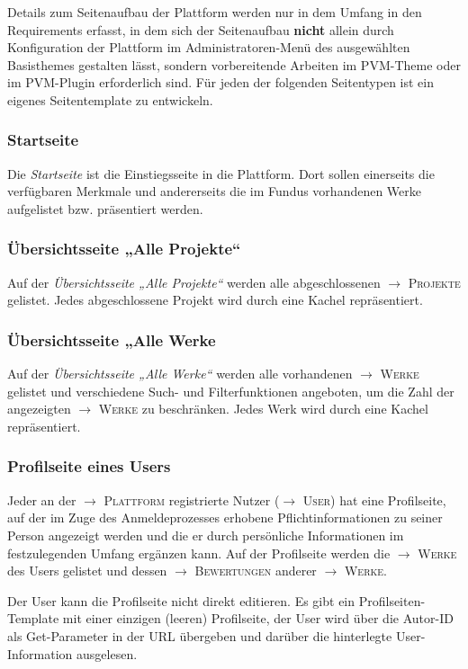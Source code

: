 \documentclass[a4paper,11pt]{article}
\newcommand{\glossar}[1]{{$\to$ \textsc{#1}}}
\begin{document}
Details zum Seitenaufbau der Plattform werden nur in dem Umfang in den
Requirements erfasst, in dem sich der Seitenaufbau \textbf{nicht} allein durch
Konfiguration der Plattform im Administratoren-Menü des ausgewählten
Basisthemes gestalten lässt, sondern vorbereitende Arbeiten im PVM-Theme oder
im PVM-Plugin erforderlich sind.  Für jeden der folgenden Seitentypen ist ein
eigenes Seitentemplate zu entwickeln. 

\subsubsection{Startseite}

Die \emph{Startseite} ist die Einstiegsseite in die Plattform.  Dort sollen
einerseits die verfügbaren Merkmale und andererseits die im Fundus vorhandenen
Werke aufgelistet bzw. präsentiert werden.  

\subsubsection{Übersichtsseite „Alle Projekte“}
Auf der \emph{Übersichtsseite „Alle Projekte“} werden alle abgeschlossenen
\glossar{Projekte} gelistet.  Jedes abgeschlossene Projekt wird durch eine
Kachel repräsentiert.

\subsubsection{Übersichtsseite „Alle Werke}
Auf der \emph{Übersichtsseite „Alle Werke“} werden alle vorhandenen
\glossar{Werke} gelistet und verschiedene Such- und Filterfunktionen
angeboten, um die Zahl der angezeigten \glossar{Werke} zu beschränken.  Jedes
Werk wird durch eine Kachel repräsentiert.

\subsubsection{Profilseite eines Users}
Jeder an der \glossar{Plattform} registrierte Nutzer (\glossar{User}) hat eine
Profilseite, auf der im Zuge des Anmeldeprozesses erhobene Pflichtinformationen
zu seiner Person angezeigt werden und die er durch persönliche Informationen im
festzulegenden Umfang ergänzen kann.  Auf der Profilseite werden die
\glossar{Werke} des Users gelistet und dessen \glossar{Bewertungen} anderer
\glossar{Werke}.  

Der User kann die Profilseite nicht direkt editieren. Es gibt ein
Profilseiten-Template mit einer einzigen (leeren) Profilseite, der User wird
über die Autor-ID als Get-Parameter in der URL übergeben und darüber die
hinterlegte User-Information ausgelesen. 
\end{document}
